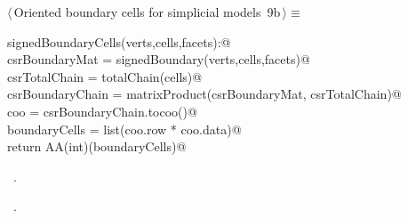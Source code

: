 \documentclass[11pt,oneside]{article}	%
\begin{document}
\begin{flushleft} \small
\begin{minipage}{\linewidth} \label{scrap22}
\protect{}$\langle\,$Oriented boundary cells for simplicial models\nobreak\ {\footnotesize 9b}$\,\rangle\equiv$
\vspace{-1ex}
\begin{list}{}{} \item
\mbox{}\verb@def signedBoundaryCells(verts,cells,facets):@\\
\mbox{}\verb@   csrBoundaryMat = signedBoundary(verts,cells,facets)@\\
\mbox{}\verb@   csrTotalChain = totalChain(cells)@\\
\mbox{}\verb@   csrBoundaryChain = matrixProduct(csrBoundaryMat, csrTotalChain)@\\
\mbox{}\verb@   coo = csrBoundaryChain.tocoo()@\\
\mbox{}\verb@   boundaryCells = list(coo.row * coo.data)@\\
\mbox{}\verb@   return AA(int)(boundaryCells)@\\
\mbox{}\verb@@{\NWsep}
\end{list}
\vspace{-1ex}
\footnotesize\addtolength{\baselineskip}{-1ex}
\begin{list}{}{\setlength{\itemsep}{-\parsep}\setlength{\itemindent}{-\leftmargin}}
\item \NWtxtMacroDefBy\ .
\item \NWtxtMacroRefIn\ .
\end{list}
\end{minipage}\\[4ex]
\end{flushleft}
\end{document}
